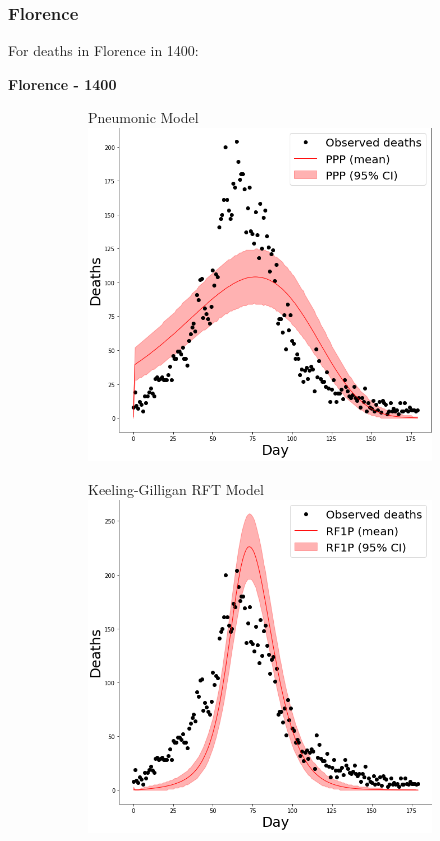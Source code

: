 \documentclass [letterpaper, 12pt] {article}
\begin{document}
\newpage

\subsubsection{Florence}
For deaths in Florence in 1400:

\begin{center}
	\textbf{Florence - 1400}
\end{center}
\begin{figure}[H]
	\begin{subfigure}{0.5\textwidth}
		\centering
		Pneumonic Model
		\includegraphics[width=\linewidth]{pneum/florence}
	\end{subfigure}\hspace{\fill}
	\begin{subfigure}{0.5\textwidth}
		\centering
		Keeling-Gilligan RFT Model
		\includegraphics[width=\linewidth]{rats1/florence}

\end{subfigure}
\end{figure}
\end{document}
